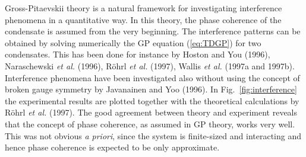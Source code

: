 Gross-Pitaevskii theory is a natural framework for investigating
interference phenomena in a quantitative way. In this theory, the phase
coherence of the condensate is assumed from the very beginning. The
interference patterns can be obtained by solving numerically the GP equation
(\ref{eq:TDGP}) for two condensates. This has been done for instance
by Hoston and You (1996), Naraschewski {\it et al.} (1996),  
R\"ohrl {\it et al.} (1997), Wallis {\it et al.} (1997a and 1997b). 
Interference phenomena have been investigated also without using 
the concept of  broken gauge symmetry by
Javanainen and Yoo (1996). In Fig.~\ref{fig:interference}
the experimental results are plotted together with the theoretical
calculations by R\"ohrl {\it et al.} (1997). The good agreement between
theory and experiment reveals that the concept of phase coherence,
as assumed in GP theory, works very well.  This was not obvious 
{\it a priori}, since the system is finite-sized and interacting 
and hence phase coherence is expected to be only approximate. 


